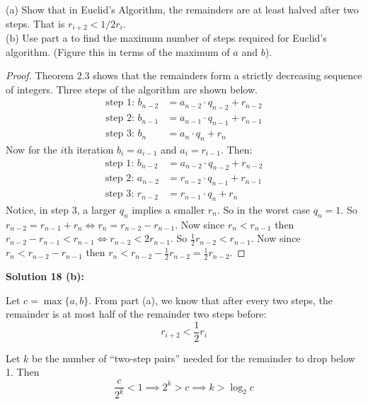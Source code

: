 \documentclass[8pt]{article}
\begin{document}
\begin{tcolorbox}[title=Problem 18, breakable]
    (a) Show that in Euclid's Algorithm, the remainders are at least halved
    after two steps. That is $r_{i + 2} < 1/2 r_i$. \\

    (b) Use part a to find the maximum number of steps required for Euclid's
    algorithm. (Figure this in terms of the maximum of $a$ and $b$).
\end{tcolorbox}

\begin{proof}
    Theorem $2.3$ shows that the remainders form a strictly decreasing sequence of integers.
    Three steps of the algorithm are shown below.
    \begin{align*}
        \text{step $1$: }b_{n - 2} &= a_{n - 2} \cdot q_{n - 2} + r_{n - 2} \\
        \text{step $2$: }b_{n - 1} &= a_{n - 1} \cdot q_{n - 1} + r_{n - 1} \\
        \text{step $3$: }b_{n} &= a_{n} \cdot q_{n} + r_{n}
    \end{align*}
    Now for the $i$th iteration $b_i = a_{i - 1}$ and $a_i = r_{i - 1}$. Then:
    \begin{align*}
        \text{step $1$: }b_{n - 2} &= a_{n - 2} \cdot q_{n - 2} + r_{n - 2} \\
        \text{step $2$: }a_{n - 2} &= r_{n - 2} \cdot q_{n - 1} + r_{n - 1} \\
        \text{step $3$: }r_{n - 2} &= r_{n - 1} \cdot q_{n} + r_{n}
    \end{align*}
    Notice, in step $3$, a larger $q_n$ implies a smaller $r_n$.
    So in the worst case $q_n = 1$. So $r_{n - 2} = r_{n - 1} + r_{n} \iff r_n = r_{n - 2} - r_{n - 1}$.
    Now since $r_n < r_{n - 1}$ then $r_{n - 2} - r_{n - 1} < r_{n - 1} \iff r_{n - 2} < 2r_{n - 1}$.
    So $\frac{1}{2} r_{n - 2} < r_{n - 1}$. 
    Now since $r_n < r_{n - 2} - r_{n - 1}$ then $r_n < r_{n - 2} - \frac{1}{2} r_{n - 2} = \frac{1}{2} r_{n - 2}$.
\end{proof}

\textbf{Solution 18 (b):}

Let $c = \max\{a, b\}$.
From part (a), we know that after every two steps, the remainder is at most half of the remainder two steps before: 
\[
r_{i+2} < \frac{1}{2} r_i
\]

Let \(k\) be the number of ``two-step pairs'' needed for the remainder to drop below 1. Then
\[
\frac{c}{2^k} < 1 \implies 2^k > c \implies k > \log_2 c
\]
\end{document}
